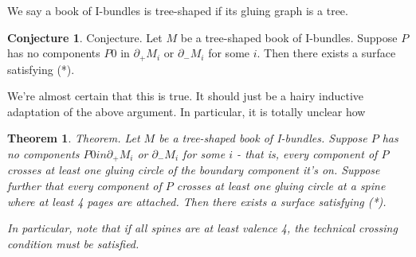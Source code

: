 \documentclass[12pt]{amsart}
\newtheorem{thm}[theorem]{Theorem}
\theoremstyle{definition}
\newtheorem{conj}[theorem]{Conjecture}
\newcommand{\bd}{\partial}
\begin{document}
We say a book of I-bundles is tree-shaped if its gluing graph is a tree.

\begin{conj}

Conjecture. Let $M$ be a tree-shaped book of I-bundles. Suppose $P$ has no
components $P0$ in $\bd_+M_i$ or $\bd_-M_i$ for some $i$. Then there exists a surface
satisfying (*).

\end{conj}

We're almost certain that this is true. It should just be a hairy inductive
adaptation of the above argument. In particular, it is totally unclear how

\begin{thm}

Theorem. Let $M$ be a tree-shaped book of I-bundles. Suppose $P$ has no components
$P0 in \bd_+M_i$ or $\bd_-M_i$ for some $i$ - that is, every component of $P$ crosses at least
one gluing circle of the boundary component it's on. Suppose further that every
component of $P$ crosses at least one gluing circle at a spine where at least
4 pages are attached. Then there exists a surface satisfying (*).

In particular, note that if all spines are at least valence 4, the technical
crossing condition must be satisfied.

\end{thm}
\end{document}
